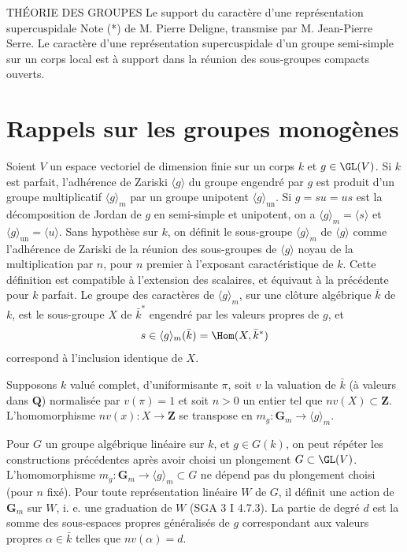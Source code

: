 \DTitleBlock
  {THÉORIE DES GROUPES}
  {Le support du caractère d'une représentation supercuspidale}
  {Note (*) de M. Pierre Deligne, transmise par M. Jean-Pierre Serre.}
  {Le caractère d'une représentation supercuspidale d'un groupe semi-simple sur un corps local est à support dans la réunion des sous-groupes compacts ouverts.}

\section{Rappels sur les groupes monogènes}

Soient \(V\) un espace vectoriel de dimension finie sur un corps \(k\) et
\(g\in\GL(V)\). Si \(k\) est parfait, l'adhérence de Zariski
\(\langle g\rangle\) du groupe engendré par \(g\) est produit d'un groupe
multiplicatif \(\langle g\rangle_m\) par un groupe unipotent
\(\langle g\rangle_{\mathrm{un}}\). Si \(g=su=us\) est la décomposition de
Jordan de \(g\) en semi-simple et unipotent, on a
\(\langle g\rangle_m=\langle s\rangle\) et
\(\langle g\rangle_{\mathrm{un}}=\langle u\rangle\). Sans hypothèse sur
\(k\), on définit le sous-groupe \(\langle g\rangle_m\) de
\(\langle g\rangle\) comme l'adhérence de Zariski de la réunion des
sous-groupes de \(\langle g\rangle\) noyau de la multiplication par \(n\),
pour \(n\) premier à l'exposant caractéristique de \(k\). Cette définition
est compatible à l'extension des scalaires, et équivaut à la précédente pour
\(k\) parfait. Le groupe des caractères de \(\langle g\rangle_m\), sur une
clôture algébrique \(\bar{k}\) de \(k\), est le sous-groupe \(X\) de
\(\bar{k}^{*}\) engendré par les valeurs propres de \(g\), et
\[
  s\in\langle g\rangle_m(\bar{k})=\Hom(X,\bar{k}^{*})
\]
correspond à l'inclusion identique de \(X\).

Supposons \(k\) valué complet, d'uniformisante \(\pi\), soit \(v\) la
valuation de \(\bar{k}\) (à valeurs dans \(\mathbf{Q}\)) normalisée par
\(v(\pi)=1\) et soit \(n>0\) un entier tel que
\(nv(X)\subset\mathbf{Z}\). L'homomorphisme
\(nv(x):X\to\mathbf{Z}\) se transpose en
\(m_g:\mathbf{G}_m\to\langle g\rangle_m\).

Pour \(G\) un groupe algébrique linéaire sur \(k\), et \(g\in G(k)\), on peut
répéter les constructions précédentes après avoir choisi un plongement
\(G\subset\GL(V)\). L'homomorphisme
\(m_g:\mathbf{G}_m\to\langle g\rangle_m\subset G\) ne dépend pas du
plongement choisi (pour \(n\) fixé). Pour toute représentation linéaire \(W\)
de \(G\), il définit une action de \(\mathbf{G}_m\) sur \(W\), i. e. une
graduation de \(W\) (SGA 3 I 4.7.3). La partie de degré \(d\) est la somme
des sous-espaces propres généralisés de \(g\) correspondant aux valeurs
propres \(\alpha\in\bar{k}\) telles que \(nv(\alpha)=d\).

